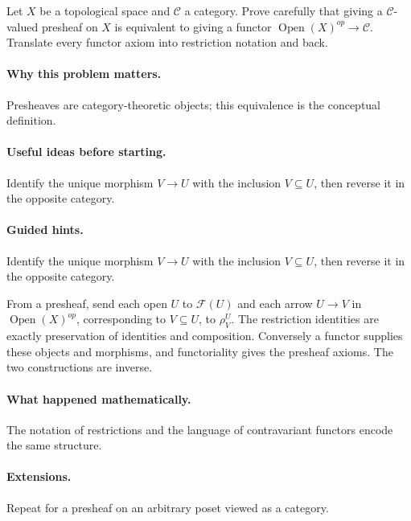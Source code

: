 \begin{problem}
Let $X$ be a topological space and $\mathcal C$ a category.  Prove carefully that giving a $\mathcal C$-valued presheaf on $X$ is equivalent to giving a functor $\operatorname{Open}(X)^{op}\to\mathcal C$.  Translate every functor axiom into restriction notation and back.
\end{problem}

\paragraph{Why this problem matters.}
Presheaves are category-theoretic objects; this equivalence is the conceptual definition.

\paragraph{Useful ideas before starting.}
Identify the unique morphism $V\to U$ with the inclusion $V\subseteq U$, then reverse it in the opposite category.

\paragraph{Guided hints.}
Identify the unique morphism $V\to U$ with the inclusion $V\subseteq U$, then reverse it in the opposite category.

\begin{solution}
From a presheaf, send each open $U$ to $\mathcal F(U)$ and each arrow $U\to V$ in $\operatorname{Open}(X)^{op}$, corresponding to $V\subseteq U$, to $\rho^U_V$.  The restriction identities are exactly preservation of identities and composition.  Conversely a functor supplies these objects and morphisms, and functoriality gives the presheaf axioms.  The two constructions are inverse.
\end{solution}

\paragraph{What happened mathematically.}
The notation of restrictions and the language of contravariant functors encode the same structure.

\paragraph{Extensions.}
Repeat for a presheaf on an arbitrary poset viewed as a category.
